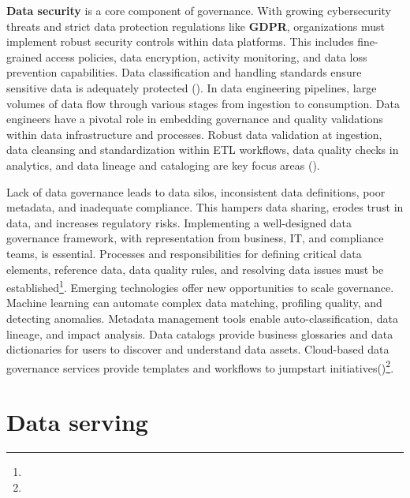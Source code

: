 \textbf{Data security} is a core component of governance. With growing cybersecurity threats and strict data protection regulations like \textbf{GDPR}, organizations must implement robust security controls within data platforms. This includes fine-grained access policies, data encryption, activity monitoring, and data loss prevention capabilities. Data classification and handling standards ensure sensitive data is adequately protected (\cite{Achanta2023DataGA})\footnotemark[23]. In data engineering pipelines, large volumes of data flow through various stages from ingestion to consumption. Data engineers have a pivotal role in embedding governance and quality validations within data infrastructure and processes. Robust data validation at ingestion, data cleansing and standardization within ETL workflows, data quality checks in analytics, and data lineage and cataloging are key focus areas (\cite{Achanta2023DataGA})\footnotemark[23].

Lack of data governance leads to data silos, inconsistent data definitions, poor metadata, and inadequate compliance. This hampers data sharing, erodes trust in data, and increases regulatory risks. Implementing a well-designed data governance framework, with representation from business, IT, and compliance teams, is essential. Processes and responsibilities for defining critical data elements, reference data, data quality rules, and resolving data issues must be established\footnote[24]{}. Emerging technologies offer new opportunities to scale governance. Machine learning can automate complex data matching, profiling quality, and detecting anomalies. Metadata management tools enable auto-classification, data lineage, and impact analysis. Data catalogs provide business glossaries and data dictionaries for users to discover and understand data assets. Cloud-based data governance services provide templates and workflows to jumpstart initiatives(\cite{Achanta2023DataGA})\footnote[23]{}.

\section{Data serving}

